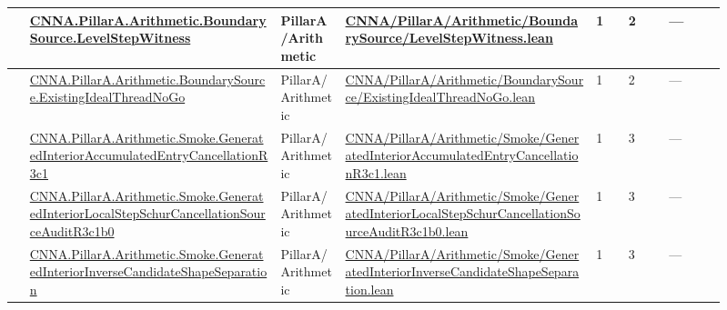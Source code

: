 \begin{longtable}{L{0.025\linewidth} L{0.315\linewidth} L{0.08\linewidth} L{0.315\linewidth} L{0.045\linewidth} L{0.055\linewidth} L{0.07\linewidth}}
\hline
{} & \href{run:repo_snapshot/CNNA/PillarA/Arithmetic/BoundarySource/LevelStepWitness.lean}{CNNA.\allowbreak{}PillarA.\allowbreak{}Arithmetic.\allowbreak{}BoundarySource.\allowbreak{}LevelStepWitness} & PillarA/\allowbreak{}Arithmetic & \href{run:repo_snapshot/CNNA/PillarA/Arithmetic/BoundarySource/LevelStepWitness.lean}{CNNA/\allowbreak{}PillarA/\allowbreak{}Arithmetic/\allowbreak{}BoundarySource/\allowbreak{}LevelStepWitness.\allowbreak{}lean} & 1 & 2 & ---\\
\hline
{} & \href{run:repo_snapshot/CNNA/PillarA/Arithmetic/BoundarySource/ExistingIdealThreadNoGo.lean}{CNNA.\allowbreak{}PillarA.\allowbreak{}Arithmetic.\allowbreak{}BoundarySource.\allowbreak{}ExistingIdealThreadNoGo} & PillarA/\allowbreak{}Arithmetic & \href{run:repo_snapshot/CNNA/PillarA/Arithmetic/BoundarySource/ExistingIdealThreadNoGo.lean}{CNNA/\allowbreak{}PillarA/\allowbreak{}Arithmetic/\allowbreak{}BoundarySource/\allowbreak{}ExistingIdealThreadNoGo.\allowbreak{}lean} & 1 & 2 & ---\\
\hline
{} & \href{run:repo_snapshot/CNNA/PillarA/Arithmetic/Smoke/GeneratedInteriorAccumulatedEntryCancellationR3c1.lean}{CNNA.\allowbreak{}PillarA.\allowbreak{}Arithmetic.\allowbreak{}Smoke.\allowbreak{}GeneratedInteriorAccumulatedEntryCancellationR3c1} & PillarA/\allowbreak{}Arithmetic & \href{run:repo_snapshot/CNNA/PillarA/Arithmetic/Smoke/GeneratedInteriorAccumulatedEntryCancellationR3c1.lean}{CNNA/\allowbreak{}PillarA/\allowbreak{}Arithmetic/\allowbreak{}Smoke/\allowbreak{}GeneratedInteriorAccumulatedEntryCancellationR3c1.\allowbreak{}lean} & 1 & 3 & ---\\
\hline
{} & \href{run:repo_snapshot/CNNA/PillarA/Arithmetic/Smoke/GeneratedInteriorLocalStepSchurCancellationSourceAuditR3c1b0.lean}{CNNA.\allowbreak{}PillarA.\allowbreak{}Arithmetic.\allowbreak{}Smoke.\allowbreak{}GeneratedInteriorLocalStepSchurCancellationSourceAuditR3c1b0} & PillarA/\allowbreak{}Arithmetic & \href{run:repo_snapshot/CNNA/PillarA/Arithmetic/Smoke/GeneratedInteriorLocalStepSchurCancellationSourceAuditR3c1b0.lean}{CNNA/\allowbreak{}PillarA/\allowbreak{}Arithmetic/\allowbreak{}Smoke/\allowbreak{}GeneratedInteriorLocalStepSchurCancellationSourceAuditR3c1b0.\allowbreak{}lean} & 1 & 3 & ---\\
\hline
{} & \href{run:repo_snapshot/CNNA/PillarA/Arithmetic/Smoke/GeneratedInteriorInverseCandidateShapeSeparation.lean}{CNNA.\allowbreak{}PillarA.\allowbreak{}Arithmetic.\allowbreak{}Smoke.\allowbreak{}GeneratedInteriorInverseCandidateShapeSeparation} & PillarA/\allowbreak{}Arithmetic & \href{run:repo_snapshot/CNNA/PillarA/Arithmetic/Smoke/GeneratedInteriorInverseCandidateShapeSeparation.lean}{CNNA/\allowbreak{}PillarA/\allowbreak{}Arithmetic/\allowbreak{}Smoke/\allowbreak{}GeneratedInteriorInverseCandidateShapeSeparation.\allowbreak{}lean} & 1 & 3 & ---\\

\end{longtable}
